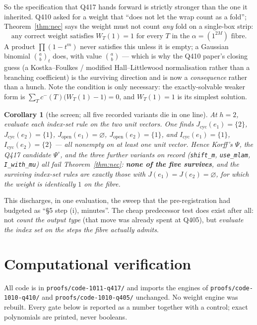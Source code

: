 \documentclass[11pt]{article}
\theoremstyle{plain}
\newtheorem{corollary}[theorem]{Corollary}
\theoremstyle{definition}
\newcommand{\Jop}{J_{\mathrm{open}}}
\newcommand{\Jcyc}{J_{\mathrm{cyc}}}
\newcommand{\Psiop}{\Psi^{\circ}}
\begin{document}
So the specification that Q417 hands forward is strictly stronger than the one it inherited.
Q410 asked for a weight that ``does not let the wrap count as a fold''; Theorem~\ref{thm:nec}
says the weight must not count \emph{any} fold on a single-box strip:
\[
\boxed{\ \text{any correct weight satisfies } W_T(1)=1 \text{ for every }T
\text{ in the } \alpha=(1^{2M})\text{ fibre.}\ }
\]
A product $\prod(1-t^{m})$ never satisfies this unless it is empty; a Gaussian binomial
$\binom{a}{b}_t$ does, with value $\binom{a}{b}$ --- which is why the Q410 paper's closing guess
(a Kostka--Foulkes / modified Hall--Littlewood normalisation rather than a branching coefficient)
is the surviving direction and is now a \emph{consequence} rather than a hunch. Note the
condition is only necessary: the exactly-solvable weaker form is
$\sum_Tc^-(T)\bigl(W_T(1)-1\bigr)=0$, and $W_T(1)=1$ is its simplest solution.

\begin{corollary}[the screen; all five recorded variants die in one line]\label{cor:screen}
At $h=2$, evaluate each index-set rule on the two unit vectors. One finds
$\Jcyc(e_1)=\{2\}$, $\Jcyc(e_2)=\{1\}$, $\Jop(e_1)=\varnothing$, $\Jop(e_2)=\{1\}$, and
$I_{\mathrm{cyc}}(e_1)=\{1\}$, $I_{\mathrm{cyc}}(e_2)=\{2\}$ --- all nonempty on at least one
unit vector. Hence Korff's $\Psi$, the Q417 candidate $\Psiop$, and the three further variants on
record (\texttt{shift\_m}, \texttt{use\_mlam}, \texttt{I\_with\_mu}) all fail
Theorem~\ref{thm:nec}: \textbf{none of the five survives}, and the surviving index-set rules are
exactly those with $J(e_1)=J(e_2)=\varnothing$, for which the weight is identically $1$ on the
fibre.
\end{corollary}

This discharges, in one evaluation, the sweep that the pre-registration had budgeted as
``\S5 step (i), minutes''. The cheap predecessor test does exist after all: not
\emph{count the output type} (that move was already spent at Q405), but
\emph{evaluate the index set on the steps the fibre actually admits}.

\section{Computational verification}\label{sec:verif}

All code is in \texttt{proofs/code-1011-q417/} and imports the engines of
\texttt{proofs/code-1010-q410/} and \texttt{proofs/code-1010-q405/} unchanged. No weight engine
was rebuilt. Every gate below is reported as a number together with a control; exact polynomials
are printed, never booleans.
\end{document}
